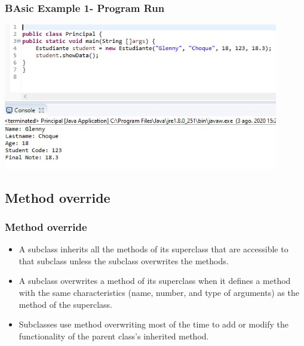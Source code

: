 \documentclass[11pt]{beamer}
\begin{document}
\begin{frame}
\frametitle{BAsic Example 1- Program Run}
\begin{center}
{\includegraphics[width=12.0cm]{img/RunBasicExample1.png}}
\end{center}
\end{frame}


\begin{frame}
\section{Method override}
\frametitle{Method override}
\begin{itemize}
\item A subclass inherits all the methods of its superclass that are accessible to that subclass unless the subclass overwrites the methods.

\item A subclass overwrites a method of its superclass when it defines a method with the same characteristics (name, number, and type of arguments) as the method of the superclass.

\item Subclasses use method overwriting most of the time to add or modify the functionality of the parent class's inherited method.
\end{itemize}
\end{frame}
\end{document}
